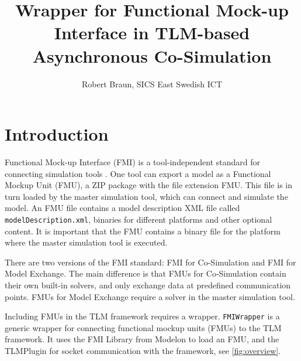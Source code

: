 \documentclass[11pt,a4paper,english]{report}
\begin{document}


\title{Wrapper for Functional Mock-up Interface in TLM-based Asynchronous Co-Simulation}


\author{
  Robert Braun, SICS East Swedish ICT
}


\makefrontpage

\clearpage
\section{Introduction}
Functional Mock-up Interface (FMI) is a tool-independent standard for connecting simulation tools \cite{blochwitz2009}. 
One tool can export a model as a Functional Mockup Unit (FMU), a ZIP package with the file extension FMU. 
This file is in turn loaded by the master simulation tool, which can connect and simulate the model.
An FMU file contains a model description XML file called \texttt{modelDescription.xml}, binaries for different platforms and other optional content.
It is important that the FMU contains a binary file for the platform where the master simulation tool is executed.

There are two versions of the FMI standard: FMI for Co-Simulation and FMI for Model Exchange.
The main difference is that FMUs for Co-Simulation contain their own built-in solvers, and only exchange data at predefined communication points.
FMUs for Model Exchange require a solver in the master simulation tool.

Including FMUs in the TLM framework requires a wrapper.
\texttt{FMIWrapper} is a generic wrapper for connecting functional mockup units (FMUs) to the TLM framework.
It uses the FMI Library from Modelon \cite{modelon2015} to load an FMU, and the TLMPlugin for socket communication with the framework, see \cref{fig:overview}.
\end{document}
